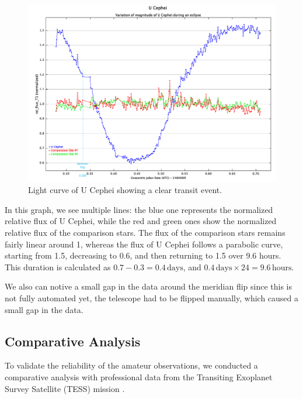 \documentclass[12pt,a4paper]{article}
\begin{document}
\begin{figure}[H]
    \centering
    \includegraphics[width=1\textwidth]{assets/Measurements.png}
    \caption{Light curve of U Cephei showing a clear transit event.}
    \label{fig:light_curve}
\end{figure}

In this graph, we see multiple lines: the blue one represents the normalized relative flux of U Cephei, while the red and green ones show the normalized relative flux of the comparison stars. The flux of the comparison stars remains fairly linear around 1, 
whereas the flux of U Cephei follows a parabolic curve, starting from 1.5, decreasing to 0.6, and then returning to 1.5 over 9.6 hours. This duration is calculated as \( 0.7 - 0.3 = 0.4 \, \text{days} \), and \( 0.4 \, \text{days} \times 24 = 9.6 \, \text{hours} \).

\medskip

We also can notive a small gap in the data around the meridian flip since this is not fully automated yet, the telescope had to be flipped manually, which caused a small gap in the data.

\bigskip

\subsection{Comparative Analysis}

To validate the reliability of the amateur observations, we conducted a comparative analysis with professional data from the Transiting Exoplanet Survey Satellite (TESS) mission \cite{TESS}.
\end{document}
